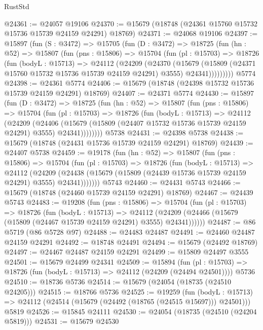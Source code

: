 \begin{lexlean}{RustStd}
\begin{coremodule}
@24361 := @24057 @19106
@24370 := @15679 (@18748 (@24361 @15760 @15732 @15736 @15739 @24159 @24291) @18769)
@24371 := @24068 @19106
@24397 := @15897
    (fun (S : @3472) =>
    @15705
      (fun (D : @3472) =>
      @18725
        (fun (hn : @52) =>
        @15807
          (fun (pns : @15806) =>
          @15704
            (fun (pl : @15703) =>
            @18726
              (fun (bodyL : @15713) =>
              @24112
                (@24209
                  (@24370
                    (@15679
                      (@15809 (@24371 @15760 @15732 @15736 @15739 @24159 @24291) @3555)
                      @24341)))))))))
    @5774
@24398 := @24361 @5774
@24406 := @15679 (@18748 (@24398 @15732 @15736 @15739 @24159 @24291) @18769)
@24407 := @24371 @5774
@24430 := @15897
    (fun (D : @3472) =>
    @18725
      (fun (hn : @52) =>
      @15807
        (fun (pns : @15806) =>
        @15704
          (fun (pl : @15703) =>
          @18726
            (fun (bodyL : @15713) =>
            @24112
              (@24209
                (@24406
                  (@15679 (@15809 (@24407 @15732 @15736 @15739 @24159 @24291) @3555) @24341))))))))
    @5738
@24431 := @24398 @5738
@24438 := @15679 (@18748 (@24431 @15736 @15739 @24159 @24291) @18769)
@24439 := @24407 @5738
@24459 := @19178
    (fun (hn : @52) =>
    @15807
      (fun (pns : @15806) =>
      @15704
        (fun (pl : @15703) =>
        @18726
          (fun (bodyL : @15713) =>
          @24112
            (@24209
              (@24438 (@15679 (@15809 (@24439 @15736 @15739 @24159 @24291) @3555) @24341)))))))
    @5743
@24460 := @24431 @5743
@24466 := @15679 (@18748 (@24460 @15739 @24159 @24291) @18769)
@24467 := @24439 @5743
@24483 := @19208
    (fun (pns : @15806) =>
    @15704
      (fun (pl : @15703) =>
      @18726
        (fun (bodyL : @15713) =>
        @24112 (@24209 (@24466 (@15679 (@15809 (@24467 @15739 @24159 @24291) @3555) @24341))))))
@24487 := @86 @5719 (@86 @5728 @97)
@24488 := @24483 @24487
@24491 := @24460 @24487 @24159 @24291
@24492 := @18748 @24491
@24494 := @15679 (@24492 @18769)
@24497 := @24467 @24487 @24159 @24291
@24499 := @15809 @24497 @3555
@24501 := @15679 @24499 @24341
@24509 := @15894
    (fun (pl : @15703) => @18726 (fun (bodyL : @15713) => @24112 (@24209 (@24494 @24501))))
    @5736
@24510 := @18736 @5736
@24514 := @15679 (@24054 (@18735 (@24510 @24205)))
@24515 := @18766 @5736
@24525 := @19259
    (fun (bodyL : @15713) => @24112 (@24514 (@15679 (@24492 (@18765 (@24515 @15697))) @24501)))
    @5819
@24526 := @15845 @24111
@24530 := @24054 (@18735 (@24510 (@24204 @5819)))
@24531 := @15679 @24530

\end{coremodule}
\end{lexlean}
